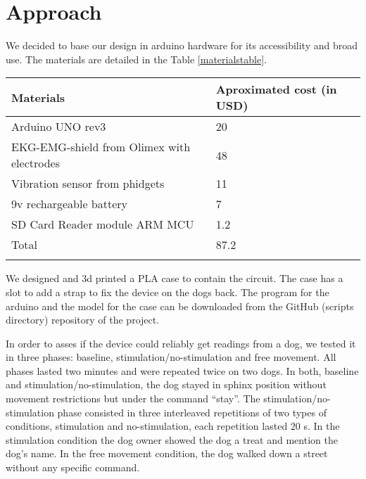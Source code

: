 \documentclass[twocolumn]{bmcart}%
\begin{document}
\section{Approach}\label{approach}

We decided to base our design in arduino hardware for its accessibility
and broad use. The materials are detailed in the Table
\ref{materialstable}.

\begin{table*}[t!]
\caption{\label{materialstable} Materials and cost. The table shows most of the materials used and their approximated cost with a local provider. Other materials were used but their cost is negligible.}
\begin{tabular}{l l}
 \hline\noalign{\smallskip}
   Materials  & Aproximated cost (in USD) \\
    \hline\noalign{\smallskip}
  Arduino UNO rev3                  & 20    \\
  EKG-EMG-shield from Olimex with electrodes    & 48    \\
  Vibration sensor from phidgets            & 11    \\
  9v rechargeable battery               & 7 \\
  SD Card Reader module ARM MCU         & 1.2   \\
  Total                     & 87.2  \\
  \noalign{\smallskip}\hline
\end{tabular}
\end{table*}

We designed and 3d printed a PLA case to contain the circuit. The case
has a slot to add a strap to fix the device on the dogs back. The
program for the arduino and the model for the case can be downloaded
from the GitHub (scripts directory) repository of the project.

In order to asses if the device could reliably get readings from a dog,
we tested it in three phases: baseline, stimulation/no-stimulation and
free movement. All phases lasted two minutes and were repeated twice on
two dogs. In both, baseline and stimulation/no-stimulation, the dog
stayed in sphinx position without movement restrictions but under the
command ``stay''. The stimulation/no-stimulation phase consisted in
three interleaved repetitions of two types of conditions, stimulation
and no-stimulation, each repetition lasted 20 s. In the stimulation
condition the dog owner showed the dog a treat and mention the dog's
name. In the free movement condition, the dog walked down a street
without any specific command.
\end{document}
